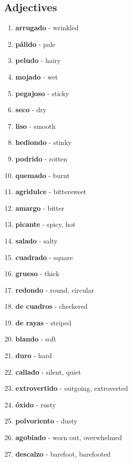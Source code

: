 \documentclass[12pt]{article}
\begin{document}
        \subsection{Adjectives}
            \begin{enumerate}
                \item \textbf{arrugado} - wrinkled
                \item \textbf{pálido} - pale
                \item \textbf{peludo} - hairy
                \item \textbf{mojado} - wet
                \item \textbf{pegajoso} - sticky
                \item \textbf{seco} - dry
                \item \textbf{liso} - smooth
                \item \textbf{hediondo} - stinky
                \item \textbf{podrido} - rotten
                \item \textbf{quemado} - burnt
                \item \textbf{agridulce} - bittersweet
                \item \textbf{amargo} - bitter
                \item \textbf{picante} - spicy, hot
                \item \textbf{salado} - salty
                \item \textbf{cuadrado} - square
                \item \textbf{grueso} - thick
                \item \textbf{redondo} - round, circular
                \item \textbf{de cuadros} - checkered
                \item \textbf{de rayas} - striped
                \item \textbf{blando} - soft
                \item \textbf{duro} - hard
                \item \textbf{callado} - silent, quiet
                \item \textbf{extrovertido} - outgoing, extroverted
                \item \textbf{óxido} - rusty
                \item \textbf{polvoriento} - dusty
                \item \textbf{agobiado} - worn out, overwhelmed
                \item \textbf{descalzo} - barefoot, barefooted

\end{enumerate}
\end{document}
